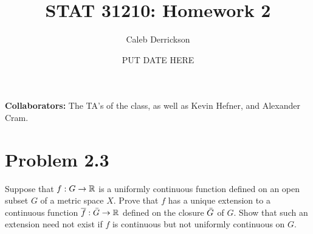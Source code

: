 

\title{STAT 31210: Homework 2}
\author{Caleb Derrickson}
\date{PUT DATE HERE}


\onehalfspacing
\maketitle
\allowdisplaybreaks
{\color{cit}\vspace{2mm}\noindent\textbf{Collaborators:}} The TA's of the class, as well as Kevin Hefner, and Alexander Cram.

\tableofcontents

\newpage
\section{Problem 2.3}
Suppose that $f: G\rightarrow \mathbb{R}$ is a uniformly continuous function defined on an open subset $G$ of a metric space $X$. Prove that $f$ has a unique extension to a continuous function $\overline{f} : \Bar{G} \rightarrow \mathbb{R}$ defined on the closure $\Bar{G}$ of $G$. Show that such an extension need not exist if $f$ is continuous but not uniformly continuous on $G$.

\newcommand{\fbar}{\Bar{f}}

